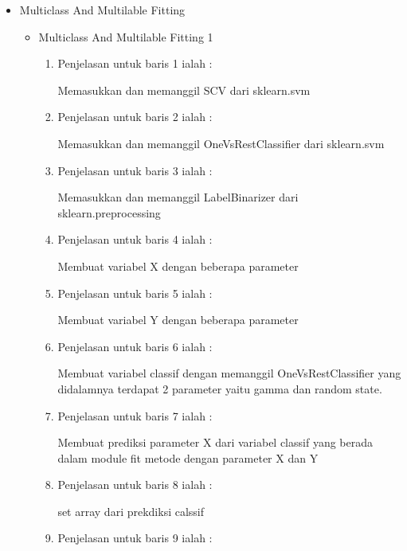 \begin{itemize}
\begin{itemize}
\par
\par
\par
\par
\par
\begin{itemize}
\item Multiclass And Multilable Fitting
\par
\begin{itemize}
\item Multiclass And Multilable Fitting 1 
\begin{enumerate}
\item Penjelasan untuk baris 1 ialah : 
\par Memasukkan dan memanggil SCV dari sklearn.svm
\par
\par
\item Penjelasan untuk baris 2 ialah :
\par Memasukkan dan memanggil OneVsRestClassifier dari sklearn.svm
\par
\item Penjelasan untuk baris 3  ialah :
\par Memasukkan dan memanggil LabelBinarizer dari sklearn.preprocessing
\par
\item Penjelasan untuk baris 4  ialah :
\par Membuat variabel X dengan beberapa parameter
\par
\item Penjelasan untuk baris 5  ialah :
\par Membuat variabel Y dengan beberapa parameter
\par
\item Penjelasan untuk baris 6 ialah :
\par Membuat variabel classif dengan memanggil OneVsRestClassifier yang didalamnya terdapat 2 parameter yaitu gamma dan random state.
\par
\item Penjelasan untuk baris 7 ialah : 
\par Membuat prediksi parameter X dari variabel classif yang berada dalam module fit metode dengan parameter X dan Y
\par
\par
\item Penjelasan untuk baris 8 ialah :
\par set array dari prekdiksi calssif
\par
\item Penjelasan untuk baris 9 ialah :

\end{enumerate}
\end{itemize}
\end{itemize}
\end{itemize}
\end{itemize}
